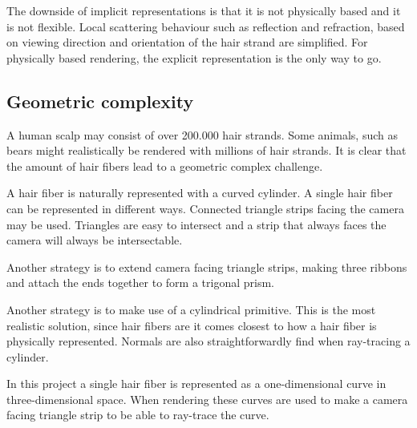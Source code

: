 \documentclass[11pt,a4paper]{report}
\begin{document}







The downside of implicit representations is that it is not physically based and it is not flexible. Local scattering behaviour such as reflection and refraction, based on viewing direction and orientation of the hair strand are simplified. For physically based rendering, the explicit representation is the only way to go.

\subsection{Geometric complexity}

A human scalp may consist of over 200.000 hair strands. Some animals, such as bears might realistically be rendered with millions of hair strands. It is clear that the amount of hair fibers lead to a geometric complex challenge. 

A hair fiber is naturally represented with a curved cylinder. A single hair fiber can be represented in different ways. Connected triangle strips facing the camera may be used. Triangles are easy to intersect and a strip that always faces the camera will always be intersectable.

Another strategy is to extend camera facing triangle strips, making three ribbons and attach the ends together to form a trigonal prism.

Another strategy is to make use of a cylindrical primitive. This is the most realistic solution, since hair fibers are it comes closest to how a hair fiber is physically represented. Normals are also straightforwardly find when ray-tracing a cylinder.

In this project a single hair fiber is represented  as a one-dimensional curve in three-dimensional space. When rendering these curves are used to make a camera facing triangle strip to be able to ray-trace the curve.
\end{document}
